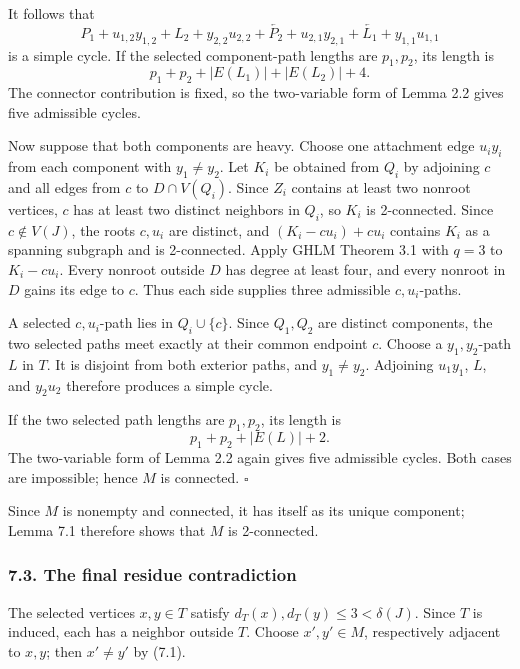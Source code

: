 \documentclass[
  11pt]{article}
\let\papersubsection\subsubsection
\renewcommand{\subsubsection}{\Needspace{7\baselineskip}\papersubsection}
\begin{document}
It follows that \[
 P_1+u_{1,2}y_{1,2}+L_2+y_{2,2}u_{2,2}
 +\overleftarrow{P_2}+u_{2,1}y_{2,1}
 +\overleftarrow{L_1}+y_{1,1}u_{1,1}
\] is a simple cycle. If the selected component-path lengths are
\(p_1,p_2\), its length is \[
 p_1+p_2+|E(L_1)|+|E(L_2)|+4.
\] The connector contribution is fixed, so the two-variable form of
Lemma 2.2 gives five admissible cycles.

Now suppose that both components are heavy. Choose one attachment edge
\(u_iy_i\) from each component with \(y_1\ne y_2\). Let \(K_i\) be
obtained from \(Q_i\) by adjoining \(c\) and all edges from \(c\) to
\(D\cap V(Q_i)\). Since \(Z_i\) contains at least two nonroot vertices,
\(c\) has at least two distinct neighbors in \(Q_i\), so \(K_i\) is
2-connected. Since \(c\notin V(J)\), the roots \(c,u_i\) are distinct,
and \((K_i-cu_i)+cu_i\) contains \(K_i\) as a spanning subgraph and is
2-connected. Apply GHLM Theorem 3.1 with \(q=3\) to \(K_i-cu_i\). Every
nonroot outside \(D\) has degree at least four, and every nonroot in
\(D\) gains its edge to \(c\). Thus each side supplies three admissible
\(c,u_i\)-paths.

A selected \(c,u_i\)-path lies in \(Q_i\cup\{c\}\). Since \(Q_1,Q_2\)
are distinct components, the two selected paths meet exactly at their
common endpoint \(c\). Choose a \(y_1,y_2\)-path \(L\) in \(T\). It is
disjoint from both exterior paths, and \(y_1\ne y_2\). Adjoining
\(u_1y_1\), \(L\), and \(y_2u_2\) therefore produces a simple cycle.

If the two selected path lengths are \(p_1,p_2\), its length is \[
 p_1+p_2+|E(L)|+2.
\] The two-variable form of Lemma 2.2 again gives five admissible
cycles. Both cases are impossible; hence \(M\) is connected. \(\square\)

Since \(M\) is nonempty and connected, it has itself as its unique
component; Lemma 7.1 therefore shows that \(M\) is 2-connected.

\subsubsection{7.3. The final residue
contradiction}\label{the-final-residue-contradiction}

The selected vertices \(x,y\in T\) satisfy
\(d_T(x),d_T(y)\le3<\delta(J)\). Since \(T\) is induced, each has a
neighbor outside \(T\). Choose \(x',y'\in M\), respectively adjacent to
\(x,y\); then \(x'\ne y'\) by (7.1).

\end{document}
